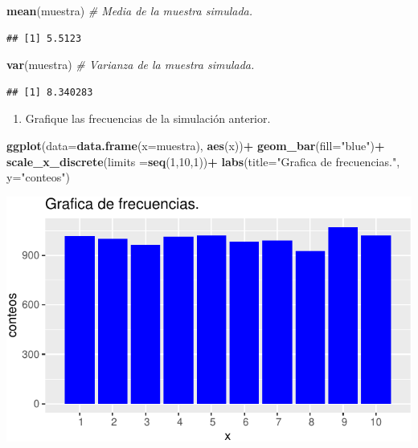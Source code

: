 \documentclass[11pt,]{article}
\newenvironment{Shaded}{\begin{snugshade}}{\end{snugshade}}
\newcommand{\CommentTok}[1]{\textcolor[rgb]{0.56,0.35,0.01}{\textit{#1}}}
\newcommand{\DataTypeTok}[1]{\textcolor[rgb]{0.13,0.29,0.53}{#1}}
\newcommand{\DecValTok}[1]{\textcolor[rgb]{0.00,0.00,0.81}{#1}}
\newcommand{\KeywordTok}[1]{\textcolor[rgb]{0.13,0.29,0.53}{\textbf{#1}}}
\newcommand{\NormalTok}[1]{#1}
\newcommand{\OperatorTok}[1]{\textcolor[rgb]{0.81,0.36,0.00}{\textbf{#1}}}
\newcommand{\StringTok}[1]{\textcolor[rgb]{0.31,0.60,0.02}{#1}}
\providecommand{\tightlist}{%
  \setlength{\itemsep}{0pt}\setlength{\parskip}{0pt}}
\begin{document}
\begin{Shaded}
\begin{Highlighting}[]
\KeywordTok{mean}\NormalTok{(muestra) }\CommentTok{# Media de la muestra simulada.}
\end{Highlighting}
\end{Shaded}

\begin{verbatim}
## [1] 5.5123
\end{verbatim}

\begin{Shaded}
\begin{Highlighting}[]
\KeywordTok{var}\NormalTok{(muestra) }\CommentTok{# Varianza de la muestra simulada.}
\end{Highlighting}
\end{Shaded}

\begin{verbatim}
## [1] 8.340283
\end{verbatim}

\begin{enumerate}
\def\labelenumi{\alph{enumi}.}
\setcounter{enumi}{3}
\tightlist
\item
  Grafique las frecuencias de la simulación anterior.
\end{enumerate}

\begin{Shaded}
\begin{Highlighting}[]
\KeywordTok{ggplot}\NormalTok{(}\DataTypeTok{data=}\KeywordTok{data.frame}\NormalTok{(}\DataTypeTok{x=}\NormalTok{muestra), }\KeywordTok{aes}\NormalTok{(x))}\OperatorTok{+}
\StringTok{  }\KeywordTok{geom_bar}\NormalTok{(}\DataTypeTok{fill=}\StringTok{"blue"}\NormalTok{)}\OperatorTok{+}
\StringTok{  }\KeywordTok{scale_x_discrete}\NormalTok{(}\DataTypeTok{limits =}\KeywordTok{seq}\NormalTok{(}\DecValTok{1}\NormalTok{,}\DecValTok{10}\NormalTok{,}\DecValTok{1}\NormalTok{))}\OperatorTok{+}
\StringTok{  }\KeywordTok{labs}\NormalTok{(}\DataTypeTok{title=}\StringTok{"Grafica de frecuencias."}\NormalTok{, }\DataTypeTok{y=}\StringTok{"conteos"}\NormalTok{)}
\end{Highlighting}
\end{Shaded}

\begin{center}\includegraphics{Tarea_1_files/figure-latex/unnamed-chunk-5-1} \end{center}
\end{document}
